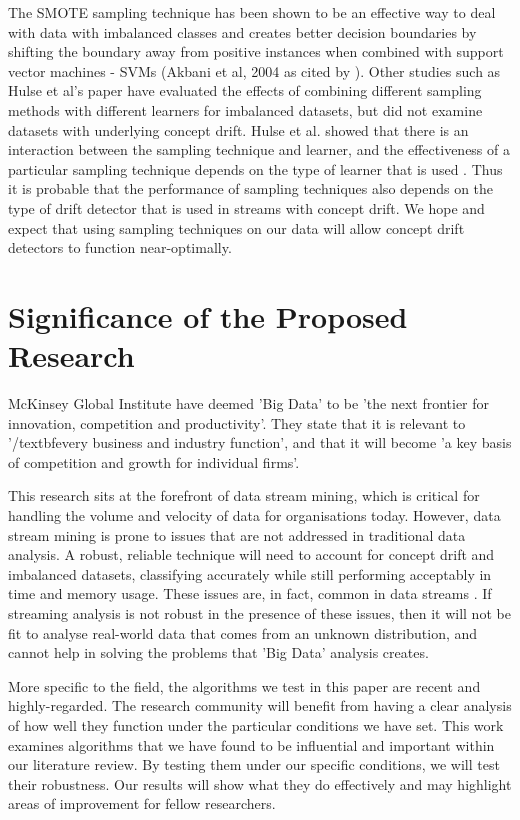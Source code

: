\documentclass[11pt]{article}\usepackage[]{graphicx}\usepackage[]{color}
\begin{document}
The SMOTE sampling technique has been shown to be an effective way to deal with data with imbalanced classes \cite{SMOTE} and creates better decision boundaries by shifting the boundary away from positive instances when combined with support vector machines - SVMs (Akbani et al, 2004 as cited by \cite{neuro}). Other studies such as Hulse et al's paper \cite{hulse} have evaluated the effects of combining different sampling methods with different learners for imbalanced datasets, but did not examine datasets with underlying concept drift. Hulse et al. showed that there is an interaction between the sampling technique and learner, and the effectiveness of a particular sampling technique depends on the type of learner that is used \cite{hulse}. Thus it is probable that the performance of sampling techniques also depends on the type of drift detector that is used in streams with concept drift. We hope and expect that using sampling techniques on our data will allow concept drift detectors to function near-optimally.

\section{Significance of the Proposed Research}

McKinsey Global Institute \cite{mckinsey} have deemed 'Big Data' to be 'the next frontier for innovation, competition and productivity'. They state that it is relevant to '/textbf{every} business and industry function', and that it will become 'a key basis of competition and growth for individual firms'.

This research sits at the forefront of data stream mining, which is critical for handling the volume and velocity of data for organisations today. However, data stream mining is prone to issues that are not addressed in traditional data analysis. A robust, reliable technique will need to account for concept drift and imbalanced datasets, classifying accurately while still performing acceptably in time and memory usage. These issues are, in fact, common in data streams \cite{wan13}. If streaming analysis is not robust in the presence of these issues, then it will not be fit to analyse real-world data that comes from an unknown distribution, and cannot help in solving the problems that 'Big Data' analysis creates.

More specific to the field, the algorithms we test in this paper are recent and highly-regarded. The research community will benefit from having a clear analysis of how well they function under the particular conditions we have set. This work examines algorithms that we have found to be influential and important within our literature review. By testing them under our specific conditions, we will test their robustness. Our results will show what they do effectively and may highlight areas of improvement for fellow researchers.
\end{document}
